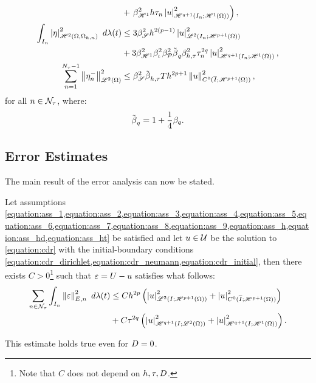\begin{lemma}
\begin{align}
        &+ \left. \beta_{\mathscr{H}^{1}}^2 h \tau_n \left\lvert u \right\rvert_{\mathscr{H}^{q + 1}(I_n; \mathscr{H}^{1}(\Omega))}^2 \right), \notag \\
        \int_{I_n}  \left\lvert \eta \right\rvert_{\mathscr{H}^{2}(\Omega, \Omega_{h, n})}^2  ~ d \lambda(t) &\leq 3 \beta_{\mathscr{S}}^2 h^{2 \left( p - 1 \right)} \left\lvert u \right\rvert_{\mathscr{L}^{2}(I_n; \mathscr{H}^{p + 1}(\Omega))}^2 \\
        &+ 3 \beta_{\mathscr{H}^{1}}^2 \beta_{\iota}^2 \beta_{\mathcal{P}_{}}^2 \tilde{\beta_{}}_q \beta_{h, \tau}^2 \tau_n^{2q} \left\lvert u \right\rvert_{\mathscr{H}^{q + 1}(I_n; \mathscr{H}^{1}(\Omega))}^2, \notag \\
        \sum_{n = 1}^{N_{\tau} - 1} \left\lVert \eta_n^- \right\rVert_{\mathscr{L}^{2}(\Omega)}^2 &\leq \beta_{\mathscr{S}}^2 \tilde{\beta_{}}_{h, \tau} T h^{2p + 1} \left\lVert u \right\rVert_{C^0(\overline{I}; \mathscr{H}^{p + 1}(\Omega))}^2,
    \end{align}
    for all $n \in \mathcal{N}_{\tau}$, where:
    \begin{align}
        \tilde{\beta_{}}_q = 1 + \frac{1}{4} \beta_{q}.
    \end{align}
\end{lemma}

\newpage
\subsection{Error Estimates}

The main result of the error analysis can now be stated.
\begin{theorem} \label{theorem:estimates_ht}
    Let assumptions \cref{equation:ass_1,equation:ass_2,equation:ass_3,equation:ass_4,equation:ass_5,equation:ass_6,equation:ass_7,equation:ass_8,equation:ass_9,equation:ass_h,equation:ass_hd,equation:ass_ht} be satisfied and let $u \in \mathcal{U}$ be the solution to \cref{equation:cdr} with the initial-boundary conditions \cref{equation:cdr_dirichlet,equation:cdr_neumann,equation:cdr_initial}, then there exists $C > 0$\footnote{Note that $C$ does not depend on $h, \tau, D$.} such that $\varepsilon = U - u$ satisfies what follows:
    \begin{align}
        \sum_{n \in \mathcal{N}_{\tau}} \int_{I_n}  \left\lVert \varepsilon \right\rVert_{E, n}^2  ~ d \lambda(t) &\leq C h^{2p} \left( \left\lvert u \right\rvert_{\mathscr{L}^{2}(I; \mathscr{H}^{p + 1}(\Omega))}^2 + \left\lvert u \right\rvert_{C^0(\overline{I}; \mathscr{H}^{p + 1}(\Omega))}^2 \right) \\
        &+ C \tau^{2q} \left( \left\lvert u \right\rvert_{\mathscr{H}^{q + 1}(I; \mathscr{L}^{2}(\Omega))}^2 + \left\lvert u \right\rvert_{\mathscr{H}^{q + 1}(I; \mathscr{H}^{1}(\Omega))}^2 \right). \notag
    \end{align}
\end{theorem}
This estimate holds true even for $D = 0$.